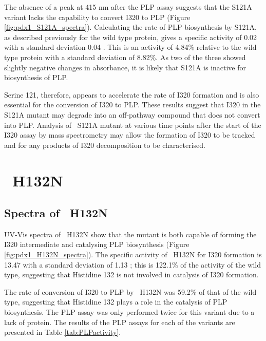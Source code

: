 The absence of a peak at 415 nm after the PLP assay suggests that the S121A variant lacks the capability to convert I320 to PLP (Figure \ref{fig:pdx1_S121A_spectra}). Calculating the rate of PLP biosynthesis by S121A, as described previously for the wild type protein, gives a specific activity of 0.02 \act with a standard deviation 0.04 \act. This is an activity of 4.84\% relative to the wild type protein with a standard deviation of 8.82\%. As two of the three showed slightly negative changes in absorbance, it is likely that S121A is inactive for biosynthesis of PLP. 

Serine 121, therefore, appears to accelerate the rate of I320 formation and is also essential for the conversion of I320 to PLP. These results suggest that I320 in the S121A mutant may degrade into an off-pathway compound that does not convert into PLP. Analysis of \atpdx ~S121A mutant at various time points after the start of the I320 assay by mass spectrometry may allow the formation of I320 to be tracked and for any products of I320 decomposition to be characterised.    

\clearpage
\section{\atpdx ~H132N}


\subsection*{Spectra of \atpdx ~H132N}

UV-Vis spectra of \atpdx ~H132N show that the mutant is both capable of forming the I320 intermediate and catalysing PLP biosynthesis (Figure \ref{fig:pdx1_H132N_spectra}). The specific activity of \atpdx ~H132N for I320 formation is 13.47 \act with a standard deviation of 1.13 \act; this is 122.1\% of the activity of the wild type, suggesting that Histidine 132 is not involved in catalysis of I320 formation. 

The rate of conversion of I320 to PLP by \atpdx ~H132N was 59.2\% of that of the wild type, suggesting that Histidine 132 plays a role in the catalysis of PLP biosynthesis. The PLP assay was only performed twice for this variant due to a lack of protein. The results of the PLP assays for each of the variants are presented in Table \ref{tab:PLPactivity}. 

